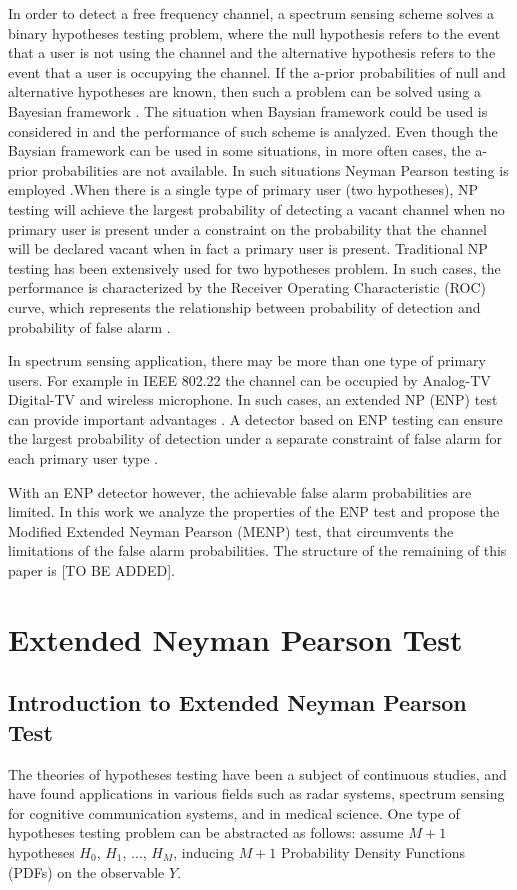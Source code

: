 \documentclass[12pt,journal,a4paper,twoside,onecolumn]{IEEEtran}
\begin{document}
\begin{spacing}{2.5}
In order to detect a free frequency channel, a spectrum sensing scheme solves a binary hypotheses testing problem, where the null hypothesis refers to the event that a user is not using the channel and the alternative hypothesis refers to the event that a user is occupying the channel. If the a-prior probabilities of null and alternative hypotheses are known, then such a problem can be solved using a Bayesian framework \cite{poor1994introduction}. The situation when Baysian framework could be used is considered in \cite{zeng2010review} and the performance of such scheme is analyzed.
Even though the Baysian framework can be used in some situations, in more often cases, the a-prior probabilities are not available. In such situations Neyman Pearson testing is employed \cite{poor1994introduction}.When there is a single type of primary user (two hypotheses), NP testing will achieve the largest probability of detecting a vacant channel when no primary user is present under a constraint on the probability that the channel will be declared vacant when in fact a primary user is present.
Traditional NP testing has been extensively used for two hypotheses problem. In such cases,  the performance is characterized by the Receiver Operating Characteristic (ROC) curve, which represents the relationship between probability of detection and probability of false alarm \cite{poor1994introduction}.

In spectrum sensing application, there may be more than one type of primary users. For example in IEEE 802.22 \cite{shellhammer2008spectrum} the channel can be occupied by Analog-TV Digital-TV and wireless microphone. In such cases, an extended NP (ENP) test can provide important advantages \cite{zhang1999design}. A detector based on ENP testing can ensure the largest probability of detection under a separate constraint of false alarm for each primary user type \cite{LehmannTest}.

With an ENP detector however, the achievable false alarm probabilities are limited. In this work we analyze the properties of the ENP test and propose the Modified Extended Neyman Pearson (MENP) test, that circumvents the limitations of the false alarm probabilities. The structure of the remaining of this paper is [TO BE ADDED].

\section{Extended Neyman Pearson Test}

\subsection{Introduction to Extended Neyman Pearson Test}
The theories of hypotheses testing have been a subject of continuous studies, and have found applications in various fields such as radar systems, spectrum sensing for cognitive communication systems, and in  medical science. One type of hypotheses testing problem can be abstracted as  follows: assume $M+1$  hypotheses $H_0$, $H_1$, ..., $H_{M}$, inducing $M+1$  Probability Density Functions (PDFs) on the observable $Y$.


\end{spacing}
\end{document}
